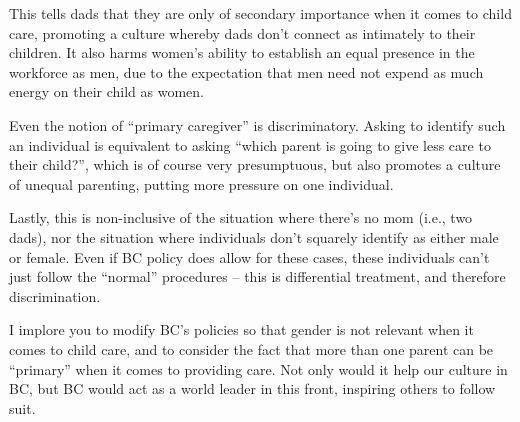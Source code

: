 \documentclass[]{article}
\begin{document}
This tells dads that they are only of secondary importance when it comes to child care, promoting a culture whereby dads don't connect as intimately to their children. It also harms women's ability to establish an equal presence in the workforce as men, due to the expectation that men need not expend as much energy on their child as women.

Even the notion of ``primary caregiver'' is discriminatory. Asking to identify such an individual is equivalent to asking ``which parent is going to give less care to their child?'', which is of course very presumptuous, but also promotes a culture of unequal parenting, putting more pressure on one individual.

Lastly, this is non-inclusive of the situation where there's no mom (i.e., two dads), nor the situation where individuals don't squarely identify as either male or female. Even if BC policy does allow for these cases, these individuals can't just follow the ``normal'' procedures -- this is differential treatment, and therefore discrimination.

I implore you to modify BC's policies so that gender is not relevant when it comes to child care, and to consider the fact that more than one parent can be ``primary'' when it comes to providing care. Not only would it help our culture in BC, but BC would act as a world leader in this front, inspiring others to follow suit.
\end{document}
